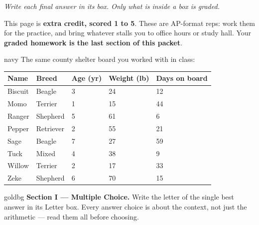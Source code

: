 \documentclass[10pt]{article}
\begin{document}
{\small\itshape Write each final answer in its box. Only what is inside a box is graded.}\par

\vspace{0.15in}

\boxguard[8]
\begin{remindbox}
\small
This page is \textbf{extra credit, scored 1 to 5}. These are AP-format reps: work them for the
practice, and bring whatever stalls you to office hours or study hall. Your \textbf{graded
homework is the last section of this packet}.
\end{remindbox}

\vspace{0.12in}

\boxguard[30]
\begin{scenariobox}{navy}
\small
The same county shelter board you worked with in class:

\vspace{8pt}
\renewcommand{\arraystretch}{1.3}
\begin{tabularx}{\linewidth}{@{} l Y Y Y Y @{}}
\textbf{Name} & \textbf{Breed} & \textbf{Age (yr)} & \textbf{Weight (lb)} & \textbf{Days on board} \\
\hline
Biscuit & Beagle    & 3 & 24 & 12 \\
Momo    & Terrier   & 1 & 15 & 44 \\
Ranger  & Shepherd  & 5 & 61 &  6 \\
Pepper  & Retriever & 2 & 55 & 21 \\
Sage    & Beagle    & 7 & 27 & 59 \\
Tuck    & Mixed     & 4 & 38 &  9 \\
Willow  & Terrier   & 2 & 17 & 33 \\
Zeke    & Shepherd  & 6 & 70 & 15 \\
\hline
\end{tabularx}
\end{scenariobox}

\vspace{0.14in}

\boxguard[16]
\begin{headlinebox}{goldbg}
\small
\textbf{Section I --- Multiple Choice.} Write the letter of the single best answer in its Letter box. Every answer choice is
about the context, not just the arithmetic --- read them all before choosing.
\end{headlinebox}
\end{document}
